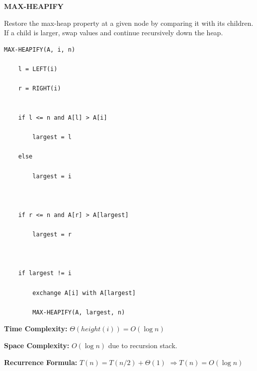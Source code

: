\documentclass[a4paper,12pt]{article}
\begin{document}
\begin{tcolorbox}[
    colback=gray!30,
    colframe=black,
    boxrule=1pt,
    arc=0mm
]

\begin{tcolorbox}[
    colback=gray!10,
    colframe=black,
    arc=0mm
]
\centering
{\Huge\bfseries MAX-HEAPIFY}
\end{tcolorbox}


\begin{tcolorbox}[
    colback=gray!10,
    colframe=black,
    arc=0mm
]
\small
Restore the max-heap property at a given node by comparing it with its children.
If a child is larger, swap values and continue recursively down the heap.
\end{tcolorbox}


\begin{tcolorbox}[
    colback=black!5,
    colframe=black,
    arc=0mm,
    title=Pseudo-code
]
\tiny
\begin{lstlisting}
MAX-HEAPIFY(A, i, n)

    l = LEFT(i)

    r = RIGHT(i)


    if l <= n and A[l] > A[i]

        largest = l

    else

        largest = i



    if r <= n and A[r] > A[largest]

        largest = r



    if largest != i

        exchange A[i] with A[largest]

        MAX-HEAPIFY(A, largest, n)
\end{lstlisting}
\end{tcolorbox}


\begin{tcolorbox}[
    colback=cyan!20,
    colframe=black,
    arc=0mm
]
\small
\textbf{Time Complexity:}
$\Theta(height(i)) = O(\log n)$
\end{tcolorbox}


\begin{tcolorbox}[
    colback=violet!20,
    colframe=black,
    arc=0mm
]
\small
\textbf{Space Complexity:}
$O(\log n)$ due to recursion stack.
\end{tcolorbox}


\begin{tcolorbox}[
    colback=pink!20,
    colframe=black,
    arc=0mm
]
\small
\textbf{Recurrence Formula:}
$T(n)=T(n/2)+\Theta(1)$
$\Rightarrow T(n)=O(\log n)$
\end{tcolorbox}

\end{tcolorbox}
\end{document}
